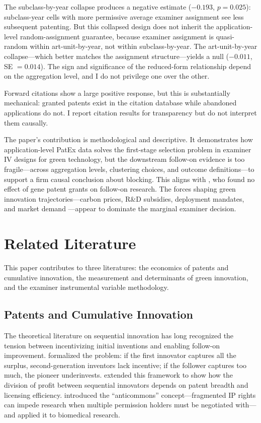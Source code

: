\documentclass[12pt]{article}
\begin{document}
The subclass-by-year collapse produces a negative estimate ($-0.193$, $p = 0.025$): subclass-year cells with more permissive average examiner assignment see less subsequent patenting. But this collapsed design does not inherit the application-level random-assignment guarantee, because examiner assignment is quasi-random within art-unit-by-year, not within subclass-by-year. The art-unit-by-year collapse---which better matches the assignment structure---yields a null ($-0.011$, SE $= 0.014$). The sign and significance of the reduced-form relationship depend on the aggregation level, and I do not privilege one over the other.

Forward citations show a large positive response, but this is substantially mechanical: granted patents exist in the citation database while abandoned applications do not. I report citation results for transparency but do not interpret them causally.

The paper's contribution is methodological and descriptive. It demonstrates how application-level PatEx data solves the first-stage selection problem in examiner IV designs for green technology, but the downstream follow-on evidence is too fragile---across aggregation levels, clustering choices, and outcome definitions---to support a firm causal conclusion about blocking. This aligns with \citet{sampat2019}, who found no effect of gene patent grants on follow-on research. The forces shaping green innovation trajectories---carbon prices, R\&D subsidies, deployment mandates, and market demand \citep{acemoglu2012, popp2002}---appear to dominate the marginal examiner decision.


\section{Related Literature}

This paper contributes to three literatures: the economics of patents and cumulative innovation, the measurement and determinants of green innovation, and the examiner instrumental variable methodology.

\subsection{Patents and Cumulative Innovation}

The theoretical literature on sequential innovation has long recognized the tension between incentivizing initial inventions and enabling follow-on improvement. \citet{scotchmer1991} formalized the problem: if the first innovator captures all the surplus, second-generation inventors lack incentive; if the follower captures too much, the pioneer underinvests. \citet{green2019} extended this framework to show how the division of profit between sequential innovators depends on patent breadth and licensing efficiency. \citet{heller1998} introduced the ``anticommons'' concept---fragmented IP rights can impede research when multiple permission holders must be negotiated with---and applied it to biomedical research.
\end{document}
